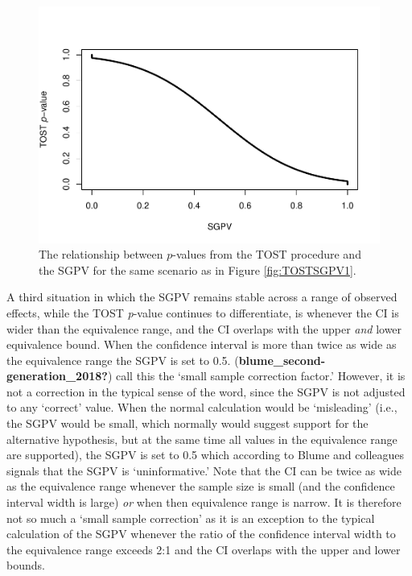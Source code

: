 \documentclass[
  english,
  man]{apa6}
\begin{document}
\begin{figure}

{\centering \includegraphics[height=0.94\textheight]{chp5_format-Rmd_bib_files/figure-latex/TOSTSGPV5-1} 

}

\caption{The relationship between $p$-values from the TOST procedure and the SGPV for the same scenario as in Figure \ref{fig:TOSTSGPV1}.}\label{fig:TOSTSGPV5}
\end{figure}

A third situation in which the SGPV remains stable across a range of observed effects, while the TOST \emph{p}-value continues to differentiate, is whenever the CI is wider than the equivalence range, and the CI overlaps with the upper \emph{and} lower equivalence bound. When the confidence interval is more than twice as wide as the equivalence range the SGPV is set to 0.5. (\textbf{blume\_second-generation\_2018?}) call this the `small sample correction factor.' However, it is not a correction in the typical sense of the word, since the SGPV is not adjusted to any `correct' value. When the normal calculation would be `misleading' (i.e., the SGPV would be small, which normally would suggest support for the alternative hypothesis, but at the same time all values in the equivalence range are supported), the SGPV is set to 0.5 which according to Blume and colleagues signals that the SGPV is `uninformative.' Note that the CI can be twice as wide as the equivalence range whenever the sample size is small (and the confidence interval width is large) \emph{or} when then equivalence range is narrow. It is therefore not so much a `small sample correction' as it is an exception to the typical calculation of the SGPV whenever the ratio of the confidence interval width to the equivalence range exceeds 2:1 and the CI overlaps with the upper and lower bounds.
\end{document}
